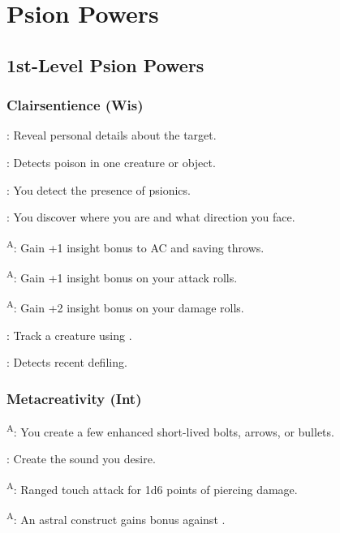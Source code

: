 \section{Psion Powers}



\subsection{1st-Level Psion Powers}


\subsubsection{Clairsentience (Wis)}

: Reveal personal details about the target.

: Detects poison in one creature or object.

: You detect the presence of psionics.

: You discover where you are and what direction you face.

\textsuperscript{A}: Gain +1 insight bonus to AC and saving throws.

\textsuperscript{A}: Gain +1 insight bonus on your attack rolls.

\textsuperscript{A}: Gain +2 insight bonus on your damage rolls.

: Track a creature using .

: Detects recent defiling.


\subsubsection{Metacreativity (Int)}

\textsuperscript{A}: You create a few enhanced short-lived bolts, arrows, or bullets.

: Create the sound you desire.

\textsuperscript{A}: Ranged touch attack for 1d6 points of piercing damage.

\textsuperscript{A}: An astral construct gains bonus against .

